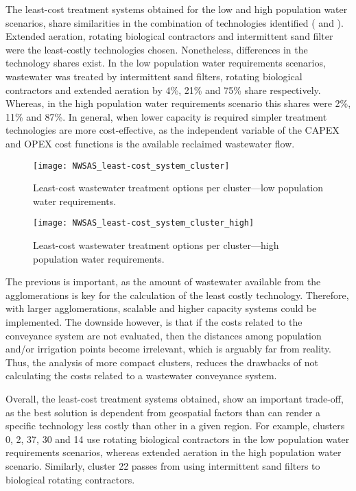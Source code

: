 The least-cost treatment systems obtained for the low and high population water scenarios, share similarities in the combination of technologies identified ( and ). Extended aeration, rotating biological contractors and intermittent sand filter were the least-costly technologies chosen. Nonetheless, differences in the technology shares exist. In the low population water requirements scenarios, wastewater was treated by intermittent sand filters, rotating biological contractors and extended aeration by 4\%, 21\% and 75\% share respectively. Whereas, in the high population water requirements scenario this shares were 2\%, 11\% and 87\%. In general, when lower capacity is required simpler treatment technologies are more cost-effective, as the independent variable of the CAPEX and OPEX cost functions is the available reclaimed wastewater flow.

\begin{figure*}[!ht]
	\centering
	\texttt{[image: NWSAS\_least-cost\_system\_cluster]}
	\caption{Least-cost wastewater treatment options per cluster---low population water requirements.}
	\label{fig:leastLow}
\end{figure*}

\begin{figure*}[!ht]
	\centering
	\texttt{[image: NWSAS\_least-cost\_system\_cluster\_high]}
	\caption{Least-cost wastewater treatment options per cluster---high population water requirements.}
	\label{fig:leastHigh}
\end{figure*}

The previous is important, as the amount of wastewater available from the agglomerations is key for the calculation of the least costly technology. Therefore, with larger agglomerations, scalable and higher capacity systems could be implemented. The downside however, is that if the costs related to the conveyance system are not evaluated, then the distances among population and/or irrigation points become irrelevant, which is arguably far from reality. Thus, the analysis of more compact clusters, reduces the drawbacks of not calculating the costs related to a wastewater conveyance system.

Overall, the least-cost treatment systems obtained, show an important trade-off, as the best solution is dependent from geospatial factors than can render a specific technology less costly than other in a given region. For example, clusters 0, 2, 37, 30 and 14 use rotating biological contractors in the low population water requirements scenarios, whereas extended aeration in the high population water scenario. Similarly, cluster 22 passes from using intermittent sand filters to biological rotating contractors.

